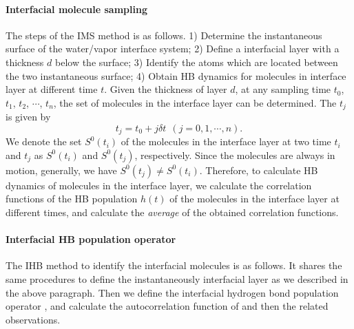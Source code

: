 \paragraph{Interfacial molecule sampling}\label{para_MS_interface}
The steps of the IMS method is as follows. 
1) Determine the instantaneous surface of the water/vapor interface system;
2) Define a interfacial layer with a thickness $d$ below the surface; 
3) Identify the atoms which are located between the two instantaneous surface;
4) Obtain HB dynamics for molecules in interface layer at different time $t$.
Given the thickness of layer $d$, at any sampling time $t_0$, $t_1$, $t_2$, $\cdots$, $t_n$, the set of molecules in the interface layer can be determined.
The $t_j$ is given by 
\begin{equation}
t_j = t_0 + j{\delta} t \ \ (j=0,1,\cdots,n).
\end{equation}
We denote the set $S^0(t_i)$ of the molecules in the interface layer at two time $t_i$  and $t_j$ as $S^0(t_i)$ and $S^0(t_j)$, respectively.
Since the molecules are always in motion, generally, we have $S^0(t_j) \neq S^0(t_i)$. 
Therefore, to calculate HB dynamics of molecules in the interface layer, we calculate the correlation functions of 
the HB population $h(t)$ of the molecules in the interface layer at different times, 
and calculate the \emph{average} of the obtained correlation functions. 
 
\paragraph{Interfacial HB population operator \hbos} 
The IHB method to identify the interfacial molecules is as follows. 
It shares the same procedures to define the instantaneously interfacial layer as we described in the above paragraph.
Then we define the interfacial hydrogen bond population operator \hbos,
and calculate the autocorrelation function of \hbos and then the related observations. 


